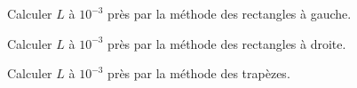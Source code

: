\question{} Calculer $L$ à $10^{-3}$ près par la méthode des rectangles à gauche.

\question{} Calculer $L$ à $10^{-3}$ près par la méthode des rectangles à droite.

\question{} Calculer $L$ à $10^{-3}$ près par la méthode des trapèzes.